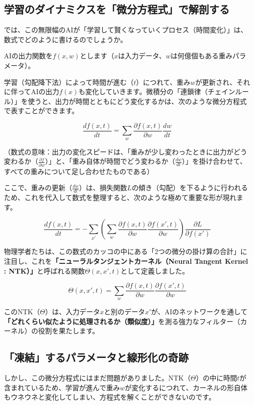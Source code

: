 \subsection{学習のダイナミクスを「微分方程式」で解剖する}

では、この無限幅のAIが「学習して賢くなっていくプロセス（時間変化）」は、数式でどのように書けるのでしょうか。

AIの出力関数を\(f(x, w)\)とします（\(x\)は入力データ、\(w\)は何億個もある重みパラメータ）。

学習（勾配降下法）によって時間が進む（\(t\)）につれて、重み\(w\)が更新され、それに伴ってAIの出力\(f(x)\)も変化していきます。微積分の「連鎖律（チェインルール）」を使うと、出力が時間とともにどう変化するかは、次のような微分方程式で表すことができます。

\[\frac{df(x, t)}{dt} = \sum_{w} \frac{\partial f(x, t)}{\partial w} \frac{dw}{dt}\]

（数式の意味：出力の変化スピードは、「重みが少し変わったときに出力がどう変わるか（\(\frac{\partial f}{\partial w}\)）」と、「重み自体が時間でどう変わるか（\(\frac{dw}{dt}\)）」を掛け合わせて、すべての重みについて足し合わせたものである）

ここで、重みの更新（\(\frac{dw}{dt}\)）は、損失関数\(L\)の傾き（勾配）を下るように行われるため、これを代入して数式を整理すると、次のような極めて重要な形が現れます。

\[\frac{df(x, t)}{dt} = - \sum_{x'} \left( \sum_{w} \frac{\partial f(x, t)}{\partial w} \frac{\partial f(x', t)}{\partial w} \right) \frac{\partial L}{\partial f(x')}\]

物理学者たちは、この数式のカッコの中にある「2つの微分の掛け算の合計」に注目し、これを\textbf{「ニューラルタンジェントカーネル（Neural Tangent Kernel : NTK）」}と呼ばれる関数\(\Theta(x, x', t)\)として定義しました。

\[\Theta(x, x', t) = \sum_{w} \frac{\partial f(x, t)}{\partial w} \frac{\partial f(x', t)}{\partial w}\]

このNTK（\(\Theta\)）は、入力データ\(x\)と別のデータ\(x'\)が、AIのネットワークを通して\textbf{「どれくらい似たように処理されるか（類似度）」}を測る強力なフィルター（カーネル）の役割を果たします。

\subsection{「凍結」するパラメータと線形化の奇跡}

しかし、この微分方程式にはまだ問題がありました。NTK（\(\Theta\)）の中に時間\(t\)が含まれているため、学習が進んで重み\(w\)が変化するにつれて、カーネルの形自体もウネウネと変化してしまい、方程式を解くことができないのです。

